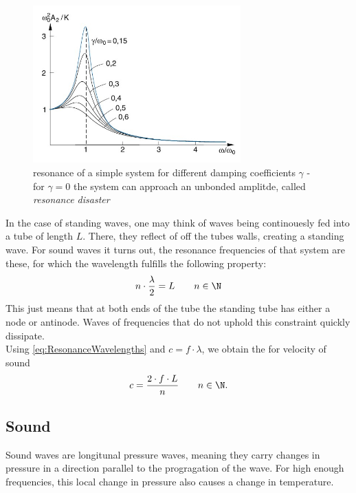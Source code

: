 \documentclass{subfiles}
\begin{document}
            \begin{figure}[H]
                \centering
                \includegraphics[width=8cm]{Bilddateien/Grundlagen/Resonanzkurve.jpg}
                \caption{resonance of a simple system for different damping coefficients $\gamma$ - for $\gamma=0$ the system can approach an unbonded amplitde, called \textit{resonance disaster}}
            \end{figure}
            
            In the case of standing waves, one may think of waves being continouesly fed into a tube of length $L$. There, they reflect of off the tubes walls, creating a standing wave. For sound waves it turns out, the resonance frequencies of that system are these, for which the wavelength fulfills the following property:
            \begin{align}
                n\cdot\frac{\lambda}{2}=L\qquad n\in\N
                \label{eq:ResonanceWavelengths}
            \end{align}
            This just means that at both ends of the tube the standing tube has either a node or antinode. Waves of frequencies that do not uphold this constraint quickly dissipate.\\

            \noindent Using \eqref{eq:ResonanceWavelengths} and $c=f\cdot\lambda$, we obtain the for velocity of sound
            \begin{align*}
                c=\frac{2\cdot f\cdot L}{n}\qquad n\in\N.
            \end{align*} 

    \subsection{Sound}
        Sound waves are longitunal pressure waves, meaning they carry changes in pressure in a direction parallel to the progragation of the wave. For high enough frequencies, this local change in pressure also causes a change in temperature.
\end{document}

